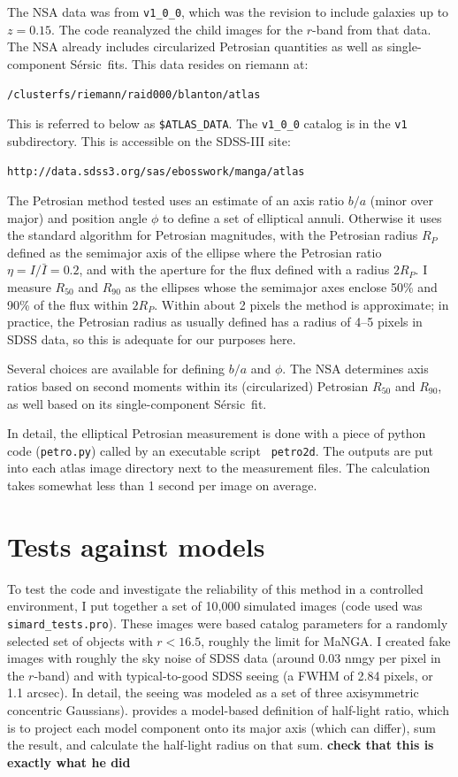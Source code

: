 \documentclass[10pt,preprint]{aastex}
\newcommand{\Sersic}{S\'ersic}
\begin{document}
The NSA data was from {\tt v1\_0\_0}, which was the revision to include
galaxies up to $z=0.15$. The code reanalyzed the child images for the
$r$-band from that data. The NSA already includes circularized
Petrosian quantities as well as single-component \Sersic\ fits. This
data resides on riemann at:
\begin{center}
{\tt /clusterfs/riemann/raid000/blanton/atlas} 
\end{center}
This is referred to below as {\tt \$ATLAS\_DATA}. The {\tt v1\_0\_0}
catalog is in the {\tt v1} subdirectory. This is accessible on the
SDSS-III site:
\begin{center}
{\tt http://data.sdss3.org/sas/ebosswork/manga/atlas}
\end{center}

The Petrosian method tested uses an estimate of an axis ratio $b/a$
(minor over major) and position angle $\phi$ to define a set of
elliptical annuli. Otherwise it uses the standard algorithm for
Petrosian magnitudes, with the Petrosian radius $R_P$ defined as the
semimajor axis of the ellipse where the Petrosian ratio $\eta= I/\bar
I = 0.2$, and with the aperture for the flux defined with a radius
$2R_P$. I measure $R_{50}$ and $R_{90}$ as the ellipses whose the
semimajor axes enclose 50\% and 90\% of the flux within $2R_P$. Within
about 2 pixels the method is approximate; in practice, the Petrosian
radius as usually defined has a radius of 4--5 pixels in SDSS data, so
this is adequate for our purposes here.

Several choices are available for defining $b/a$ and $\phi$. The NSA
determines axis ratios based on second moments within its
(circularized) Petrosian $R_{50}$ and $R_{90}$, as well based on its
single-component \Sersic\ fit. 

In detail, the elliptical Petrosian measurement is done with a piece
of python code ({\tt petro.py}) called by an executable script {\tt
petro2d}. The outputs are put into each atlas image directory next to
the measurement files. The calculation takes somewhat less than 1
second per image on average.

\section{Tests against models} 
\label{sec:models}

To test the code and investigate the reliability of this method in a
controlled environment, I put together a set of 10,000 simulated
images (code used was {\tt simard_tests.pro}). These images were based
\citet{simard11a} catalog parameters for a randomly selected set of
objects with $r<16.5$, roughly the limit for MaNGA. I created fake
images with roughly the sky noise of SDSS data (around 0.03 nmgy per
pixel in the $r$-band) and with typical-to-good SDSS seeing (a FWHM of
2.84 pixels, or 1.1 arcsec). In detail, the seeing was modeled as a
set of three axisymmetric concentric Gaussians). \citet{simard11a}
provides a model-based definition of half-light ratio, which is to
project each model component onto its major axis (which can differ),
sum the result, and calculate the half-light radius on that sum. {\bf
	check that this is exactly what he did}
\end{document}
